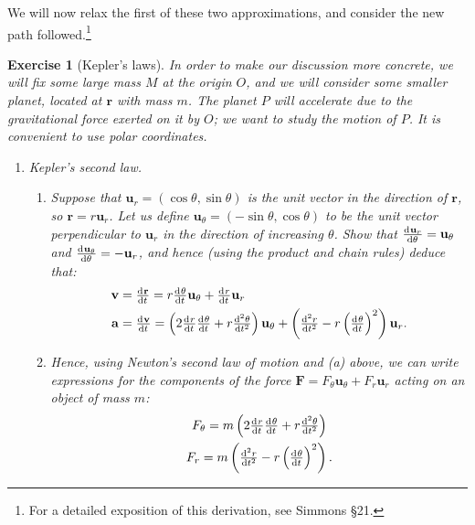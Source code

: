 \documentclass[a4paper,leqno,10pt]{article}
\theoremstyle{exercise}
\newtheorem{Exercise}{Exercise}
\newenvironment{exercise}
  {\begin{mdframed}\begin{Exercise}}
  {\end{Exercise}\end{mdframed}}
\theoremstyle{plain}
\theoremstyle{definition}
\theoremstyle{remark}
\renewcommand\vec{\mathbf}
\begin{document}
We will now relax the first of these two approximations, and consider the new path followed.\footnote{For a detailed
exposition of this derivation, see Simmons \S21.}
\begin{exercise}[Kepler's laws]
  In order to make our discussion more concrete, we will fix some large mass $ M $ at the origin $ O $, and we
  will consider some smaller planet, located at $ \vec{r} $ with mass $ m $. The planet $ P $ will accelerate due to
  the gravitational force exerted on it by $ O $; we want to study the motion of $ P $. It is convenient to use
  polar coordinates.

  \begin{enumerate}
    \item Kepler's second law.
      \begin{enumerate}
        \item Suppose that $ \vec{u}_r = (\cos \theta, \sin \theta) $ is the unit vector in the direction of $ \vec{r} $, so $ \vec{r} = r\vec{u}_r $.
              Let us define $ \vec{u}_\theta = (-\sin\theta, \cos \theta) $ to be the unit vector perpendicular to $ \vec{u}_r $ in the direction
              of increasing $ \theta $. Show that $ \od{\vec{u}_r}{\theta} = \vec{u}_\theta $ and $ \od{\vec{u}_\theta}{\theta} = -\vec{u}_r $, and hence (using
              the product and chain rules) deduce that:
              \begin{align*}
                \vec{v} &= \od{\vec{r}}{t} = r \od{\theta}{t} \vec{u}_\theta + \od{r}{t} \vec{u}_r\\
                \vec{a} &= \od{\vec{v}}{t} = \left( 2\od{r}{t} \od{\theta}{t} + r \od[2]{\theta}{t} \right) \vec{u}_\theta
                                          + \left( \od[2]{r}{t} - r \left( \od{\theta}{t} \right)^2 \right) \vec{u}_r.
              \end{align*}
        \item Hence, using Newton's second law of motion and (a) above, we can write expressions for the components of the
              force $ \vec{F} = F_\theta \vec{u}_\theta + F_r \vec{u}_r $ acting on an object of mass $ m $:
              \begin{gather*}
                F_\theta = m\left( 2\od{r}{t} \od{\theta}{t} + r \od[2]{\theta}{t} \right)\\
                F_r = m\left( \od[2]{r}{t} - r \left( \od{\theta}{t} \right)^2 \right).
              \end{gather*}


\end{enumerate}
\end{enumerate}
\end{exercise}
\end{document}
